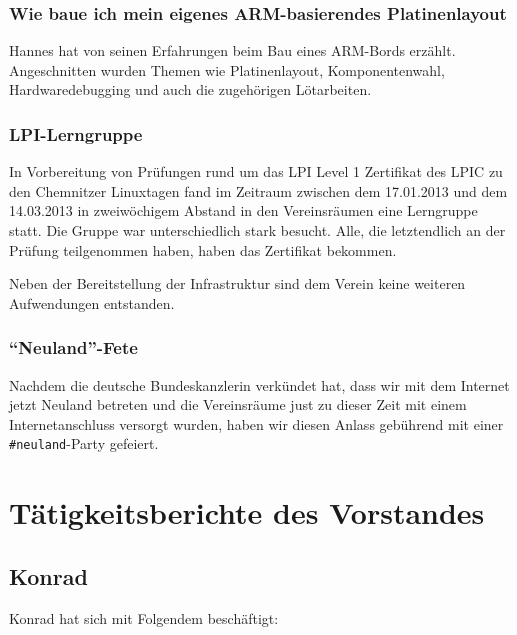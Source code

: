 \documentclass[10pt,DIV16]{scrartcl}
\begin{document}
\subsubsection{Wie baue ich mein eigenes ARM-basierendes Platinenlayout}

Hannes hat von seinen Erfahrungen beim Bau eines ARM-Bords erzählt.
Angeschnitten wurden Themen wie Platinenlayout, Komponentenwahl,
Hardwaredebugging und auch die zugehörigen Lötarbeiten.

\subsubsection{LPI-Lerngruppe}

In Vorbereitung von Prüfungen rund um das LPI Level 1 Zertifikat des
LPIC zu den Chemnitzer Linuxtagen fand im Zeitraum zwischen dem
17.01.2013 und dem 14.03.2013 in zweiwöchigem Abstand in den Vereinsräumen
eine Lerngruppe statt. Die Gruppe
war unterschiedlich stark besucht. Alle, die
letztendlich an der Prüfung teilgenommen haben, haben das
Zertifikat bekommen.

Neben der Bereitstellung der Infrastruktur sind dem Verein keine
weiteren Aufwendungen entstanden.

\subsubsection{"`Neuland"'-Fete}

Nachdem die deutsche Bundeskanzlerin verkündet hat, dass wir mit dem Internet
jetzt Neuland betreten und die Vereinsräume just zu dieser Zeit mit einem 
Internetanschluss versorgt wurden, haben wir diesen Anlass gebührend mit einer
\texttt{\#neuland}-Party gefeiert.

\section{Tätigkeitsberichte des Vorstandes}

\subsection{Konrad}

Konrad hat sich mit Folgendem beschäftigt:
\end{document}
